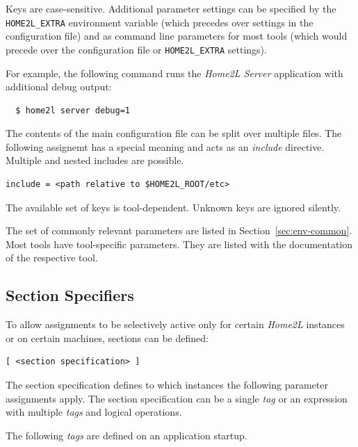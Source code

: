 \documentclass[12pt,english,parskip=half]{scrreprt}
\begin{document}
Keys are case-sensitive. Additional parameter settings can be specified
by the \texttt{HOME2L\_EXTRA} environment variable (which precedes
over settings in the configuration file) and as command line parameters
for most tools (which would precede over the configuration file or
\texttt{HOME2L\_EXTRA} settings).

For example, the following command runs the
\emph{Home2L Server} application with additional debug output:

\begin{lstlisting}
  $ home2l server debug=1
\end{lstlisting}

The contents of the main configuration file can be split over multiple files.
The following assignemt has a special meaning
and acts as an \emph{include} directive. Multiple and nested includes are possible.

\begin{lstlisting}
include = <path relative to $HOME2L_ROOT/etc>
\end{lstlisting}

The available set of keys is tool-dependent. Unknown keys are ignored silently.

The set of commonly relevant parameters are listed in Section~\ref{sec:env-common}.
Most tools have tool-specific parameters. They are listed with the
documentation of the respective tool.





\subsection{Section Specifiers}
\label{sec:home2lconf-sectionspec}


To allow assignments to be selectively active only for certain
\emph{Home2L} instances or on certain machines, sections can be defined:

\begin{lstlisting}
[ <section specification> ]
\end{lstlisting}

The section specification defines to which instances the following
parameter assignments apply.
The section specification can be a single \emph{tag} or an expression with
multiple \emph{tags} and logical operations.

The following \emph{tags} are defined on an application startup.
\end{document}
